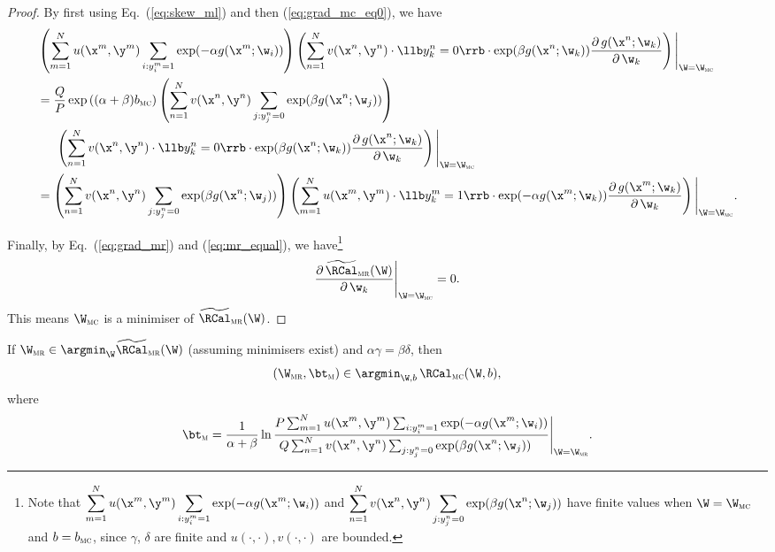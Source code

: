 \begin{proof}
By first using Eq.~(\ref{eq:skew_ml}) and then (\ref{eq:grad_mc_eq0}), we have
\begin{equation}
\label{eq:mr_equal}
\begin{aligned}
&  \left( \sum_{m=1}^N u(\x^m, \y^m) \sum_{i: y_i^m = 1} \exp(-\alpha g(\x^m; \w_i)) \right)
   \left( \sum_{n=1}^N v(\x^n, \y^n) \cdot \llb y_k^n = 0 \rrb \cdot \exp( \beta  g(\x^n; \w_k)) 
   \frac{\partial \, g(\x^n; \w_k)}{\partial \, \w_k} \right)
   \Bigg|_{\W = \W_\textsc{mc}} \\
&= \frac{Q}{P} \exp \left((\alpha + \beta) b_\textsc{mc} \right) 
   \left( \sum_{n=1}^N v(\x^n, \y^n) \sum_{j: y_j^n=0} \exp( \beta g(\x^n; \w_j)) \right) \\
&  \hspace{1.5em}
   \left( \sum_{n=1}^N v(\x^n, \y^n) \cdot \llb y_k^n = 0 \rrb \cdot \exp( \beta g(\x^n; \w_k)) 
   \frac{\partial \, g(\x^n; \w_k)}{\partial \, \w_k} \right)
   \Bigg|_{\W = \W_\textsc{mc}} \\
&= \left( \sum_{n=1}^N v(\x^n, \y^n) \sum_{j: y_j^n=0} \exp(\beta g(\x^n; \w_j)) \right)
   \left( \sum_{m=1}^N u(\x^m, \y^m) \cdot \llb y_k^m = 1 \rrb \cdot \exp(-\alpha g(\x^m; \w_k)) 
   \frac{\partial \, g(\x^m; \w_k)}{\partial \, \w_k} \right)
   \Bigg|_{\W = \W_\textsc{mc}}.
\end{aligned}
\end{equation}

Finally, by Eq.~(\ref{eq:grad_mr}) and (\ref{eq:mr_equal}), we have\footnote{
Note that $\displaystyle \sum_{m=1}^N u(\x^m, \y^m) \sum_{i: y_i^m = 1} \exp(-\alpha g(\x^m; \w_i))$ and 
$\displaystyle \sum_{n=1}^N v(\x^n, \y^n) \sum_{j: y_j^n = 0} \exp( \beta  g(\x^n; \w_j))$
have finite values when $\W = \W_\textsc{mc}$ and $b = b_\textsc{mc}$,
since $\gamma$, $\delta$ are finite and $u(\cdot,\cdot), v(\cdot, \cdot)$ are bounded.}
$$
\frac{\partial \, \widetilde\RCal_\textsc{mr}(\W)} {\partial \, \w_k} \Bigg|_{\W = \W_\textsc{mc}} = 0.
$$
This means $\W_\textsc{mc}$ is a minimiser of $\widetilde\RCal_\textsc{mr}(\W)$.
\end{proof}


\begin{theorem}
\label{theorem:mr2mc}
If $\W_\textsc{mr} \in \argmin_\W \widetilde\RCal_\textsc{mr}(\W)$ (assuming minimisers exist) and $\alpha \gamma = \beta \delta$,
then 
$$
(\W_\textsc{mr}, \bt_\textsc{m}) \in \argmin_{\W,b} \, \RCal_\textsc{mc}(\W, b),
$$ 
where
$$
\bt_\textsc{m} = \frac{1}{\alpha + \beta} \ln 
      \frac{P \sum_{m=1}^N u(\x^m, \y^m) \sum_{i: y_i^m = 1} \exp(-\alpha g(\x^m; \w_i))}
           {Q \sum_{n=1}^N v(\x^n, \y^n) \sum_{j: y_j^n = 0} \exp( \beta  g(\x^n; \w_j)) \hspace{1em}} \Bigg|_{\W = \W_\textsc{mr}}.
$$
\end{theorem}


